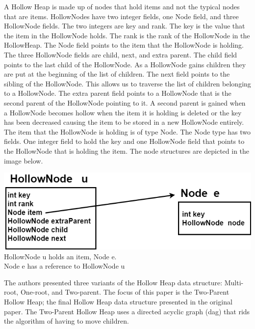 \documentclass[letter,10pt]{article}
\begin{document}
A Hollow Heap is made up of nodes that hold items and not the typical nodes that are items. HollowNodes have two integer fields, one Node field, and three HollowNode fields. The two integers are key and rank. The key is the value that the item in the HollowNode holds. The rank is the rank of the HollowNode in the HollowHeap. The Node field points to the item that the HollowNode is holding. The three HollowNode fields are child, next, and extra parent. The child field points to the last child of the HollowNode. As a HollowNode gains children they are put at the beginning of the list of children. The next field points to the sibling of the HollowNode. This allows us to traverse the list of children belonging to a HollowNode. The extra parent field points to a HollowNode that is the second parent of the HollowNode pointing to it. A second parent is gained when a HollowNode becomes hollow when the item it is holding is deleted or the key has been decreased causing the item to be stored in a new HollowNode entirely. The item that the HollowNode is holding is of type Node. The Node type has two fields. One integer field to hold the key and one HollowNode field that points to the HollowNode that is holding the item. The node structures are depicted in the image below.\\
\begin{center}
	\includegraphics[scale=.5]{one.png}\\
	\phantom{helloworld}
	HollowNode u holds an item, Node e.\\
	Node e has a reference to HollowNode u\\
\end{center}
\phantom{helloworld}
\quad The authors presented three variants of the Hollow Heap data structure: Multi-root, One-root, and Two-parent. The focus of this paper is the Two-Parent Hollow Heap; the final Hollow Heap data structure presented in the original paper. The Two-Parent Hollow Heap uses a directed acyclic graph (dag) that rids the algorithm of having to move children.\\
\end{document}
